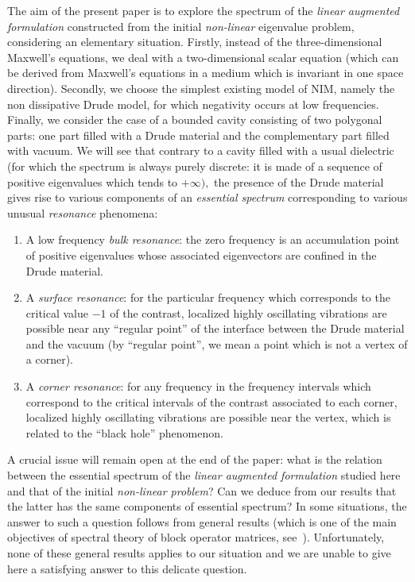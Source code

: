 The aim of the present paper is to explore the spectrum of the \emph{linear augmented formulation} constructed from the initial \emph{non-linear} eigenvalue problem, considering an elementary situation. Firstly, instead of the three-dimensional Maxwell's equations, we deal with a two-dimensional scalar equation (which can be derived from Maxwell's equations in a medium which is invariant in one space direction). Secondly, we choose the simplest existing model of NIM, namely the non dissipative Drude model, for which negativity occurs at low frequencies. Finally, we consider the case of a bounded cavity consisting of two polygonal parts: one part filled with a Drude material and the complementary part filled with vacuum. We will see that contrary to a cavity filled with a usual dielectric (for which the spectrum is always purely discrete: it is made of a sequence of positive eigenvalues which tends to $+\infty),$ the presence of the Drude material gives rise to various components of an \emph{essential spectrum} corresponding to various unusual \emph{resonance} phenomena:

\begin{enumerate}\romanenumi
\item \label{list1.1}A low frequency \emph{bulk resonance}: the zero frequency is an accumulation point of positive eigenvalues whose associated eigenvectors are confined in the Drude material.

\item \label{list1.2}A \emph{surface resonance}: for the particular frequency which corresponds to the critical value $-1$ of the contrast, localized highly oscillating vibrations are possible near any ``regular point'' of the interface between the Drude material and the vacuum (by ``regular point'', we mean a point which is not a vertex of a corner).

\item \label{list1.3}A \emph{corner resonance}: for any frequency in the frequency intervals which correspond to the critical intervals of the contrast associated to each corner, localized highly oscillating vibrations are possible near the vertex, which is related to the ``black hole'' phenomenon.
\end{enumerate}

A crucial issue will remain open at the end of the paper: what is the relation between the essential spectrum of the \emph{linear augmented formulation} studied here and that of the initial \emph{non-linear problem}? Can we deduce from our results that the latter has the same components of essential spectrum? In some situations, the answer to such a question follows from general results (which is one of the main objectives of spectral theory of block operator matrices, see~\cite{Tre-08}). Unfortunately, none of these general results applies to our situation and we are unable to give here a satisfying answer to this delicate question.

